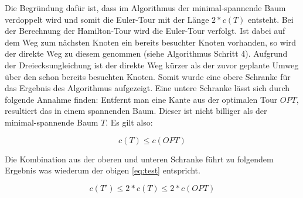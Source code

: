 \documentclass{article}
\begin{document}
Die Begründung dafür ist, dass im Algorithmus der minimal-spannende Baum verdoppelt wird und somit die Euler-Tour mit der Länge $2 * c(T)$ entsteht. Bei der Berechnung der Hamilton-Tour wird die Euler-Tour verfolgt. Ist dabei auf dem Weg zum nächsten Knoten ein bereits besuchter Knoten vorhanden, so wird der direkte Weg zu diesem genommen (siehe Algorithmus Schritt 4). Aufgrund der Dreiecksungleichung ist der direkte Weg kürzer als der zuvor geplante Umweg über den schon bereits besuchten Knoten. Somit wurde eine obere Schranke für das Ergebnis des Algorithmus aufgezeigt. Eine untere Schranke lässt sich durch folgende Annahme finden: Entfernt man eine Kante aus der optimalen Tour $OPT$, resultiert das in einem spannenden Baum. Dieser ist nicht billiger als der minimal-spannende Baum $T$. Es gilt also:

\begin{equation}
c(T) \leq c(OPT)
\end{equation}

Die Kombination aus der oberen und unteren Schranke führt zu folgendem Ergebnis was wiederum der obigen \autoref{eq:test} entspricht.

\begin{equation}
c(T') \leq 2 * c(T) \leq 2 * c(OPT)
\end{equation}



%
%
%
\nocite{busing2010graphen}
\nocite{jungnickel1994graphen}
\printbibliography[heading=bibnumbered,title={Literatur}]
\end{document}
